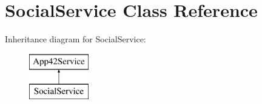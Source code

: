 \hypertarget{class_social_service}{\section{Social\+Service Class Reference}
\label{class_social_service}
}
Inheritance diagram for Social\+Service\+:\begin{figure}[H]
\begin{center}
\leavevmode
\includegraphics[height=2.000000cm]{class_social_service}
\end{center}
\end{figure}
